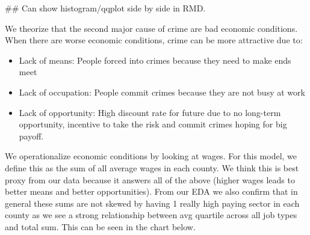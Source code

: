 \documentclass[]{article}
\newenvironment{Shaded}{}{}
\newcommand{\CommentTok}[1]{\textcolor[rgb]{0.00,0.50,0.00}{#1}}
\providecommand{\tightlist}{%
  \setlength{\itemsep}{0pt}\setlength{\parskip}{0pt}}
\begin{document}
\begin{Shaded}
\begin{Highlighting}[]
\CommentTok{## Can show histogram/qqplot side by side in RMD. }
\end{Highlighting}
\end{Shaded}

We theorize that the second major cause of crime are bad economic
conditions. When there are worse economic conditions, crime can be more
attractive due to:

\begin{itemize}
\tightlist
\item
  Lack of means: People forced into crimes because they need to make
  ends meet
\item
  Lack of occupation: People commit crimes because they are not busy at
  work
\item
  Lack of opportunity: High discount rate for future due to no long-term
  opportunity, incentive to take the risk and commit crimes hoping for
  big payoff.
\end{itemize}

We operationalize economic conditions by looking at wages. For this
model, we define this as the sum of all average wages in each county. We
think this is best proxy from our data because it answers all of the
above (higher wages leads to better means and better opportunities).
From our EDA we also confirm that in general these sums are not skewed
by having 1 really high paying sector in each county as we see a strong
relationship between avg quartile across all job types and total sum.
This can be seen in the chart below.
\end{document}
